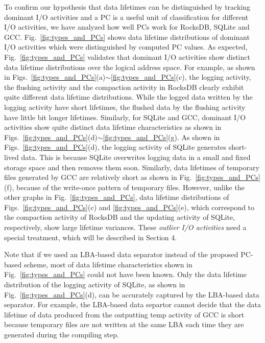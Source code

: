 To confirm our hypothesis that data lifetimes can be distinguished by tracking
dominant I/O activities and a PC is a useful unit of classification for 
different I/O activities,
we have analyzed how well PCs work for RocksDB, SQLite and GCC.
Fig.~\ref{fig:types_and_PCs} shows data lifetime distributions of 
dominant I/O activities which were distinguished by computed PC values.
As expected, Fig.~\ref{fig:types_and_PCs} validates that dominant I/O activities 
show distinct data lifetime distributions over the logical address space.
For example, as shown in Figs.~\ref{fig:types_and_PCs}(a)$\sim$\ref{fig:types_and_PCs}(c), 
the logging activity, the flushing activity and the compaction activity 
in RocksDB clearly exhibit quite different data lifetime distributions.
While the logged data written by the logging activity have short lifetimes, 
the flushed data by the flushing activity have little bit longer lifetimes.  
Similarly, for SQLite and GCC, dominant I/O
activities show quite distinct data lifetime characteristics as shown in 
Figs.~\ref{fig:types_and_PCs}(d)$\sim$\ref{fig:types_and_PCs}(g).
As shown in Figs.~\ref{fig:types_and_PCs}(d), the logging activity of
SQLite generates short-lived data.  This is because SQLite overwrites logging
data in a small and fixed storage space and then removes them soon. 
Similarly,
data lifetimes of temporary files generated by GCC are 
relatively short as shown in Fig.~\ref{fig:types_and_PCs}(f),
because of the write-once pattern of temporary files.
However, unlike the other graphs in Fig.~\ref{fig:types_and_PCs}, data lifetime
distributions of Figs.~\ref{fig:types_and_PCs}(c) and \ref{fig:types_and_PCs}(e),
which correspond to the compaction activity of RocksDB and the updating activity of
SQLite, respectively, show large lifetime variances.
These {\it outlier I/O activities} need a special treatment, which 
will be described in Section 4.

Note that if we used an LBA-based data separator instead of the proposed PC-based scheme, 
most of data lifetime characteristics shown in Fig.~\ref{fig:types_and_PCs} could 
not have been known.  Only the data lifetime
distribution of the logging activity of SQLite, as shown in Fig.~\ref{fig:types_and_PCs}(d), 
can be accurately captured by the LBA-based data separator.  
For example, the LBA-based data separtor cannot 
decide that the data lifetime of data produced from the outputting temp activity of GCC 
is short because temporary files are not written at the same LBA
each time they are generated during the compiling step. 


